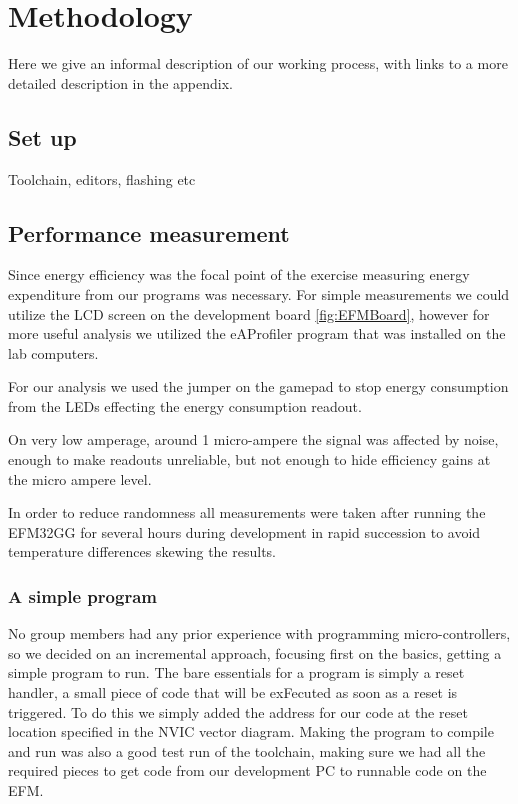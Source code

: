\chapter{Methodology}

Here we give an informal description of our working process, with links to a more detailed description in the appendix.

\section{Set up}

Toolchain, editors, flashing etc

\section{Performance measurement}

Since energy efficiency was the focal point of the exercise measuring energy expenditure from our programs was necessary. For simple measurements we could utilize the LCD screen on the development board \ref{fig:EFMBoard}, however for more useful analysis we utilized the eAProfiler program that was installed on the lab computers. 

For our analysis we used the jumper on the gamepad to stop energy consumption from the LEDs effecting the energy consumption readout. 

On very low amperage, around 1 micro-ampere the signal was affected by noise, enough to make readouts unreliable, but not enough to hide efficiency gains at the micro ampere level.

In order to reduce randomness all measurements were taken after running the EFM32GG for several hours during development in rapid succession to avoid temperature differences skewing the results.

\subsection{A simple program}

No group members had any prior experience with programming micro-controllers, so we decided on an incremental approach, focusing first on the basics, getting a simple program to run. The bare essentials for a program is simply a reset handler, a small piece of code that will be exFecuted as soon as a reset is triggered. To do this we simply added the address for our code at the reset location specified in the NVIC vector diagram. Making the program to compile and run was also a good test run of the toolchain, making sure we had all the required pieces to get code from our development PC to runnable code on the EFM. 

